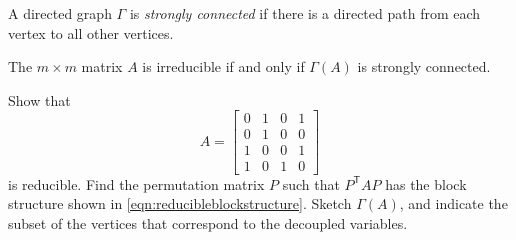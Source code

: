 \begin{definition}
A directed graph $\Gamma$ is \emph{strongly connected}
if there is a directed path from each vertex to all other vertices.
\end{definition}
\begin{theorem}
The $m\times m$ matrix $A$ is irreducible if and only if $\Gamma(A)$
is strongly connected.
\end{theorem}

\newpage
\begin{exercises}
\begin{exercise}
Show that
\begin{equation}
   A = \begin{bmatrix}
                0 & 1 & 0 & 1 \\
                0 & 1 & 0 & 0 \\ 1 & 0 & 0 & 1 \\ 1 & 0 & 1 & 0
       \end{bmatrix}
\end{equation}
is reducible.  Find the permutation matrix $P$ such that $P^{\textsf{T}}AP$
has the block structure shown in \eqref{eqn:reducibleblockstructure}.
Sketch $\Gamma(A)$, and indicate the subset of the vertices
that correspond to the decoupled variables.
\end{exercise}
\end{exercises}
%
\newpage
%
